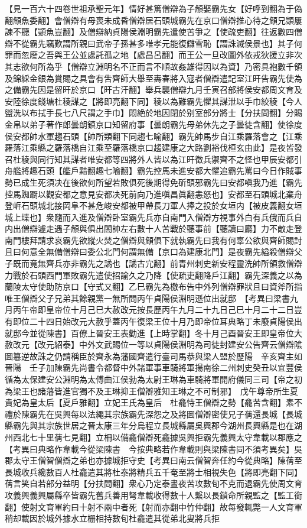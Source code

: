 【見一百六十四卷世祖承聖元年】情好甚篤僧辯為子頠娶霸先女【好呼到翻為于偽翻頠魚委翻】會僧辯有母喪未成昏僧辯居石頭城霸先在京口僧辯推心待之頠兄顗屢諫不聽【顗魚豈翻】及僧辯納貞陽侯淵明霸先遣使苦爭之【使疏吏翻】往返數四僧辯不從霸先竊歎謂所親曰武帝子孫甚多唯孝元能復讎雪恥【謂誅滅侯景也】其子何罪而忽廢之吾與王公並處託孤之地【處昌呂翻】而王公一旦改圖外依戎狄援立非次其志欲何所為乎【僧辯立淵明名不正而言不順故姦雄得因以為資】乃密具袍數千領及錦綵金銀為賞賜之具會有吿齊師大舉至夀春將入寇者僧辯遣記室江旰告霸先使為之備霸先因是留旰於京口【旰古汗翻】舉兵襲僧辯九月壬寅召部將侯安都周文育及安陸徐度錢塘杜稜謀之【將即亮翻下同】稜以為難霸先懼其謀泄以手巾絞稜【今人盥洗以布拭手長七八尺謂之手巾】悶絶於地因閉於别室部分將士【分扶問翻】分賜金帛以弟子著作郎曇朗鎮京口知留府事【曇朗霸先母弟休先之子曇徒含翻】使徐度侯安都帥水軍趨石頭【帥所類翻下同趨七喻翻】霸先帥馬步自江乘羅落會之【江乘羅落江乘縣之羅落橋自江乘至羅落橋京口趨建康之大路劉裕伐桓玄由此】是夜皆發召杜稜與同行知其謀者唯安都等四將外人皆以為江旰徵兵禦齊不之怪也甲辰安都引舟艦將趣石頭【艦戶黯翻趣七喻翻】霸先控馬未進安都大懼追霸先罵曰今日作賊事勢已成生死須决在後欲何所望若敗俱死後期得免斫頭邪霸先曰安都嗔我乃進【霸先控馬踟蹰以觀安都之意見安都决死前向乃進嗔昌眞翻恚怒也】安都至石頭城北棄舟登㟁石頭城北接岡阜不甚危峻安都被甲帶長刀軍人捧之投於女垣内【被皮義翻女垣城上堞也】衆隨而入進及僧辯卧室霸先兵亦自南門入僧辯方視事外白有兵俄而兵自内出僧辯遽走遇子頠與俱出閤帥左右數十人苦戰於聽事前【聽讀曰廳】力不敵走登南門樓拜請求哀霸先欲縱火焚之僧辯與頠俱下就執霸先曰我有何辜公欲與齊師賜討且曰何意全無備僧辯曰委公北門何謂無備【京口為建康北門】是夜霸先縊殺僧辯父子既而竟無齊兵亦非霸先之譎也【譎古宂翻】前青州刺史新安程靈洗帥所領救僧辯力戰於石頭西門軍敗霸先遣使招諭久之乃降【使疏吏翻降戶江翻】霸先深義之以為蘭陵太守使助防京口【守式又翻】乙巳霸先為檄布告中外列僧辯罪狀且曰資斧所指唯王僧辯父子兄弟其餘親黨一無所問丙午貞陽侯淵明遜位出就邸　【考異曰梁書九月丙午帝即皇帝位十月己巳大赦改元按長歷丙午九月二十九日己巳十月二十二日豈有即位二十四日始改元大赦乎蓋丙午復梁王位十月乃即帝位耳典略丁未廢貞陽侯出就邸今並從陳書】百僚上晉安王表勸進【上時掌翻】冬十月己酉晉安王即皇帝位大赦改元【改元紹泰】中外文武賜位一等以貞陽侯淵明為司徒封建安公告齊云僧辯隂圖簒逆故誅之仍請稱臣於齊永為藩國齊遣行臺司馬恭與梁人盟於歷陽　辛亥齊主如晉陽　壬子加陳霸先尚書令都督中外諸軍事車騎將軍揚南徐二州刺史癸丑以宜豐侯循為太保建安公淵明為太傅曲江侯勃為太尉王琳為車騎將軍開府儀同三司【帝之初為梁王也諸藩皆進官獨不及王琳抑王僧辯雅知王琳之不可制邪】　戊午尊帝所生夏貴妃為皇太后【夏戶雅翻】立妃王氏為皇后　杜龕恃王僧辯之勢【龕苦含翻】素不禮於陳霸先在吳興每以法繩其宗族霸先深怨之及將圖僧辯密使兄子蒨還長城【長城縣霸先與其宗族世居之晉太康三年分烏程立長城縣屬吳興郡今湖州長興縣是也在湖州西北七十里蒨七見翻】立柵以備龕僧辯死龕據吳興拒霸先義興太守韋載以郡應之　【考異曰典略作韋載今從梁陳書　今按典略若作韋載則與梁陳書同不須考異矣】吳郡太守王僧智僧辯之弟也亦據城拒守史【考異曰南云僧智奔任約今從典略】陳蒨至長城收兵纔數百人杜龕遣其將杜泰將精兵五千奄至將士相視失色【將即亮翻下同】蒨言笑自若部分益明【分扶問翻】衆心乃定泰晝夜苦攻數旬不克而退霸先使周文育攻義興義興屬縣卒皆霸先舊兵善用弩韋載收得數十人繫以長鎖命所親監之【監工銜翻】使射文育軍約曰十射不兩中者死【射而亦翻中竹仲翻】故每發輒斃一人文育軍稍却載因於城外據水立栅相持數旬杜龕遣其從弟北叟將兵拒